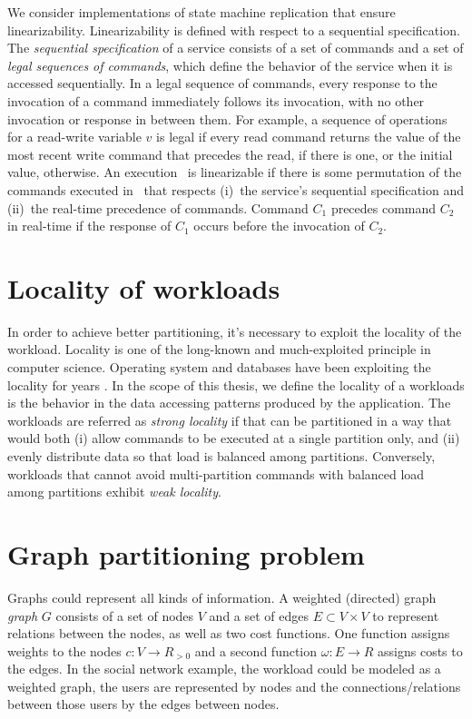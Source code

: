 We consider implementations of state machine replication that ensure
linearizability. Linearizability is defined with respect to a sequential
specification. The \emph{sequential specification} of a service consists of a
set of commands and a set of \emph{legal sequences of commands}, which define
the behavior of the service when it is accessed sequentially. In a legal
sequence of commands, every response to the invocation of a command immediately
follows its invocation, with no other invocation or response in between them.
For example, a sequence of operations for a read-write variable $v$ is legal if
every read command returns the value of the most recent write command that
precedes the read, if there is one, or the initial value, otherwise. An
execution \ex\ is linearizable if there is some permutation of the commands
executed in \ex\ that respects (i)~the service's sequential specification and
(ii)~the real-time precedence of commands. Command $C_1$ precedes command $C_2$
in real-time if the response of $C_1$ occurs before the invocation of $C_2$.

\section{Locality of workloads}
\label{sysmodel:locality}
In order to achieve better partitioning, it's necessary to exploit the locality
of the workload. Locality is one of the long-known and much-exploited principle in
computer science. Operating system and databases have been exploiting the
locality for years \cite{locality:os}. In the scope of this thesis, we define
the locality of a workloads is the behavior in the data accessing patterns
produced by the application. The workloads are referred as \emph{strong
locality} if that can be partitioned in a way that would both (i) allow commands
to be executed at a single partition only, and (ii) evenly distribute data so
that load is balanced among partitions. Conversely, workloads that cannot avoid
multi-partition commands with balanced load among partitions exhibit \emph{weak
locality}.

\section{Graph partitioning problem}

Graphs could represent all kinds of information.  A weighted (directed) graph
\emph{graph} $G$ consists of a set of nodes $V$ and a set of edges $E \subset V
\times V$ to represent relations between the nodes, as well as two cost
functions. One function assigns weights to the nodes $c : V \rightarrow R_{>0}$
and a second function $\omega : E \rightarrow R$ assigns costs to the edges. In
the social network example, the workload could be modeled as a weighted graph,
the users are represented by nodes and the connections/relations between those
users by the edges between nodes.


